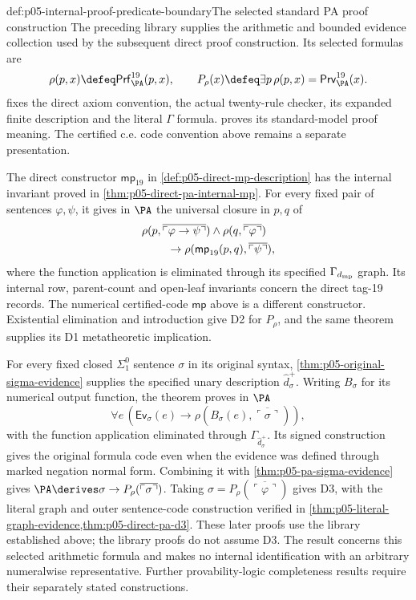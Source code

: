 \begin{proofboundary}{def:p05-internal-proof-predicate-boundary}{The selected standard PA proof construction}
The preceding library supplies the arithmetic and bounded evidence
collection used by the subsequent direct proof construction. Its selected
formulas are
\[
 \rho(p,x)\defeq\mathsf{Prf}^{19}_{\PA}(p,x),\qquad
 P_\rho(x)\defeq\exists p\,\rho(p,x)
                       =\mathsf{Prv}^{19}_{\PA}(x).
\]
fixes the direct axiom convention, the actual twenty-rule checker,
its expanded finite description and the literal \(\Gamma\) formula.
proves its standard-model proof meaning. The certified c.e. code convention
above remains a separate presentation.

The direct constructor \(\mathsf{mp}_{19}\) in
\cref{def:p05-direct-mp-description} has the internal invariant proved in
\cref{thm:p05-direct-pa-internal-mp}. For every fixed pair of sentences
\(\varphi,\psi\), it gives in \(\PA\) the universal closure in
\(p,q\) of
\[
\begin{split}
 &\rho(p,\overline{\ulcorner\varphi\to\psi\urcorner})
       \land\rho(q,\overline{\ulcorner\varphi\urcorner})\\
 &\hspace{8mm}\to
       \rho(\mathsf{mp}_{19}(p,q),\overline{\ulcorner\psi\urcorner}),
\end{split}
\]
where the function application is eliminated through its specified
\(\Gamma_{d_{\rm mp}}\) graph. Its internal row, parent-count and
open-leaf invariants concern the direct tag-19 records. The numerical
certified-code \(\mathsf{mp}\) above is a different constructor.
Existential elimination and introduction give D2 for \(P_\rho\), and
the same theorem supplies its D1 metatheoretic implication.

For every fixed closed \(\Sigma^0_1\) sentence \(\sigma\) in its
original syntax, \cref{thm:p05-original-sigma-evidence} supplies the
specified unary description \(\widehat d_\sigma^+\). Writing
\(B_\sigma\) for its numerical output function, the theorem proves
in \(\PA\)
\[
 \forall e\,(\mathsf{Ev}_\sigma(e)\to
       \rho(B_\sigma(e),\overline{\ulcorner\sigma\urcorner})),
\]
with the function application eliminated through
\(\Gamma_{\widehat d_\sigma^+}\). Its signed construction gives the
original formula code even when the evidence was defined through marked
negation normal form. Combining it with \cref{thm:p05-pa-sigma-evidence}
gives
\(\PA\derives\sigma\to P_\rho(\overline{\ulcorner\sigma\urcorner})\).
Taking \(\sigma=P_\rho(\overline{\ulcorner\varphi\urcorner})\)
gives D3, with the literal graph and outer sentence-code construction
verified in \cref{thm:p05-literal-graph-evidence,thm:p05-direct-pa-d3}.
These later proofs use the library established above; the library proofs
do not assume D3. The result concerns this selected arithmetic formula
and makes no internal identification with an arbitrary numeralwise
representative. Further provability-logic completeness results require
their separately stated constructions.
\end{proofboundary}

